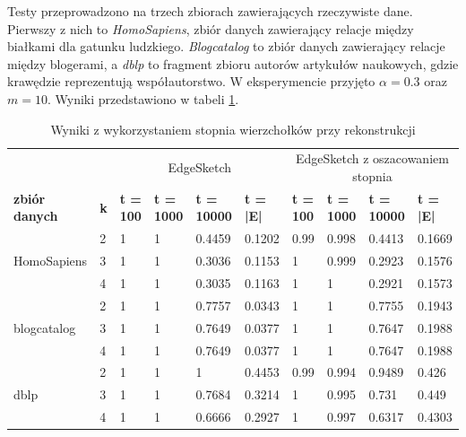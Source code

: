     Testy przeprowadzono na trzech zbiorach zawierających rzeczywiste dane. Pierwszy z nich to \emph{HomoSapiens}, zbiór danych zawierający relacje między białkami dla gatunku ludzkiego. \emph{Blogcatalog} to zbiór danych zawierający relacje między blogerami, a \emph{dblp} to fragment zbioru autorów artykułów naukowych, gdzie krawędzie reprezentują współautorstwo. W eksperymencie przyjęto $\alpha = 0.3$ oraz $m = 10$. Wyniki przedstawiono w tabeli \ref{tab:degree}.

    \begin{table}[!ht]
        \small
        \centering
        \begin{tabular}{|l|l|l|l|l|l|l|l|l|l|}
        \hline
        & & \multicolumn{4}{c|}{EdgeSketch} & \multicolumn{4}{c|}{EdgeSketch z oszacowaniem stopnia} \\ \cline{1-10}
            \textbf{zbiór danych} & \textbf{k} & \textbf{t = 100} & \textbf{t = 1000} & \textbf{t = 10000} & \textbf{t = |E|} & \textbf{t = 100} & \textbf{t = 1000} & \textbf{t = 10000} & \textbf{t = |E|} \\ \hline\hline
            \multirow{3}{*}{HomoSapiens} & 2 & 1 & 1 & 0.4459 & 0.1202 & 0.99 & 0.998 & 0.4413 & 0.1669 \\ \cline{2-10}
            & 3 & 1 & 1 & 0.3036 & 0.1153 & 1 & 0.999 & 0.2923 & 0.1576 \\ \cline{2-10}
            & 4 & 1 & 1 & 0.3035 & 0.1163 & 1 & 1 & 0.2921 & 0.1573 \\ \hline\hline
            \multirow{3}{*}{blogcatalog} & 2 & 1 & 1 & 0.7757 & 0.0343 & 1 & 1 & 0.7755 & 0.1943 \\ \cline{2-10}
            & 3 & 1 & 1 & 0.7649 & 0.0377 & 1 & 1 & 0.7647 & 0.1988 \\ \cline{2-10}
            & 4 & 1 & 1 & 0.7649 & 0.0377 & 1 & 1 & 0.7647 & 0.1988 \\ \hline\hline
            \multirow{3}{*}{dblp} & 2 & 1 & 1 & 1 & 0.4453 & 0.99 & 0.994 & 0.9489 & 0.426 \\ \cline{2-10}
            & 3 & 1 & 1 & 0.7684 & 0.3214 & 1 & 0.995 & 0.731 & 0.449 \\ \cline{2-10}
            & 4 & 1 & 1 & 0.6666 & 0.2927 & 1 & 0.997 & 0.6317 & 0.4303 \\ \hline
        \end{tabular}
        \caption{Wyniki z wykorzystaniem stopnia wierzchołków przy rekonstrukcji}
        \label{tab:degree}
    \end{table}

